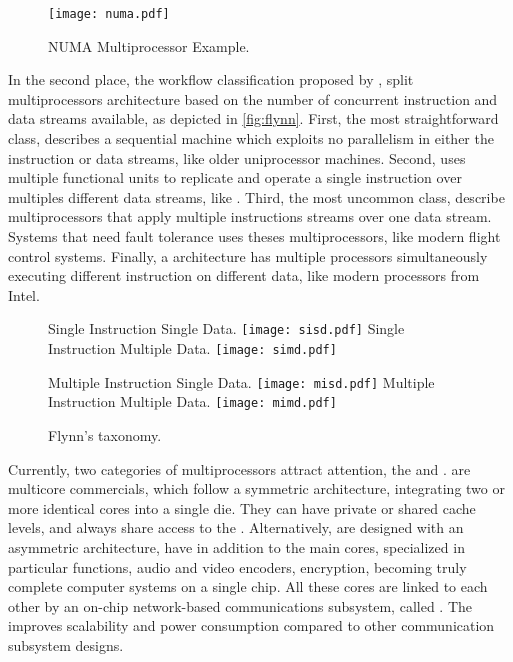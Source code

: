 			\begin{figure}[!tb]
				\centering%
				\caption{NUMA Multiprocessor Example.}%
				\label{fig:numa}%
				\texttt{[image: numa.pdf]}%
			\end{figure}

			In the second place, the workflow classification proposed by ,
			split multiprocessors architecture based on the number of concurrent
			instruction and data streams available, as depicted in \autoref{fig:flynn}.
			First, the most straightforward class, \sisd describes a sequential
			machine which exploits no parallelism in either the instruction or
			data streams, like older uniprocessor machines.
			Second, \simd uses multiple functional units to replicate and operate
			a single instruction over multiples different data streams, like \gpu.
			Third, the most uncommon class, \misd describe multiprocessors that
			apply multiple instructions streams over one data stream.
			Systems that need fault tolerance uses theses multiprocessors, like
			modern flight control systems.
			Finally, a  architecture has multiple processors simultaneously
			executing different instruction on different data, like
			modern processors from Intel.

			\begin{figure}[!tb]
				\centering%
				\caption{Flynn's taxonomy.}%
				\label{fig:flynn}%

					{Single Instruction Single Data.}%
					{\texttt{[image: sisd.pdf]}}%
				\hspace{1cm}%
					{Single Instruction Multiple Data.}%
					{\texttt{[image: simd.pdf]}}%

					{Multiple Instruction Single Data.}%
					{\texttt{[image: misd.pdf]}}%
				\hspace{1cm}%
					{Multiple Instruction Multiple Data.}%
					{\texttt{[image: mimd.pdf]}}%

			\end{figure}

			Currently, two categories of multiprocessors attract attention, the \cmp and \mpsoc.
			\cmps are multicore commercials, which follow a symmetric architecture,
			integrating two or more identical cores into a single die.
			They can have private or shared cache levels, and always share access
			to the \ram.
			Alternatively, \mpsocs are designed with an asymmetric architecture,
			have in addition to the main cores, specialized \cpus in particular
			functions, \eg audio and video encoders, encryption, becoming truly
			complete computer systems on a single chip.
			All these cores are linked to each other by an on-chip network-based
			communications subsystem, called \noc.
			The \noc improves scalability and power consumption compared to other
			communication subsystem designs.

